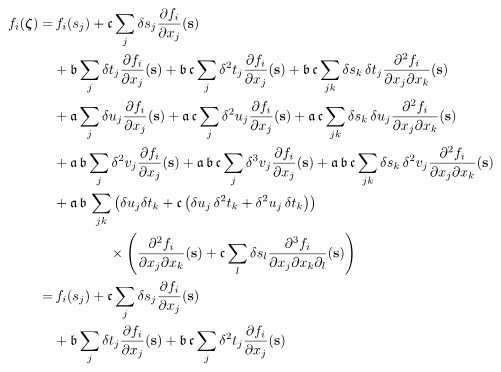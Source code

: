 \begin{align*}
f_{i} \! \left( \mbox{\boldmath{$\zeta$}} \right)
%
=& \,
f_{i} \! \left( s_{j} \right) + \mathfrak{c} \sum_{j} \delta s_{j} 
\frac{ \partial f_{i} }{ \partial x_{j} } \! \left( \mathbf{s} \right)
\\
&+ 
\mathfrak{b} \sum_{j} \delta t_{j} \frac{ \partial f_{i} }{ \partial x_{j} } \! \left( \mathbf{s} \right)
+ \mathfrak{b} \, \mathfrak{c} \sum_{j} \delta^{2} t_{j} 
\frac{ \partial f_{i} }{ \partial x_{j} } \! \left( \mathbf{s} \right) 
+ \mathfrak{b} \, \mathfrak{c} \sum_{jk} \delta s_{k} \, \delta t_{j} 
\frac{ \partial^{2} f_{i} }{ \partial x_{j} \partial x_{k} } \! \left( \mathbf{s} \right)
\\
&+ 
\mathfrak{a} \sum_{j} \delta u_{j} \frac{ \partial f_{i} }{ \partial x_{j} } \! \left( \mathbf{s} \right)
+ \mathfrak{a} \, \mathfrak{c} \sum_{j} \delta^{2} u_{j} 
\frac{ \partial f_{i} }{ \partial x_{j} } \! \left( \mathbf{s} \right) 
+ \mathfrak{a} \, \mathfrak{c} \sum_{jk} \delta s_{k} \, \delta u_{j} 
\frac{ \partial^{2} f_{i} }{ \partial x_{j} \partial x_{k} } \! \left( \mathbf{s} \right)
\\
&+ 
\mathfrak{a} \, \mathfrak{b} \sum_{j} \delta^{2} v_{j} 
\frac{ \partial f_{i} }{ \partial x_{j} } \! \left( \mathbf{s} \right)
+ \mathfrak{a} \, \mathfrak{b} \, \mathfrak{c} \sum_{j} \delta^{3} v_{j} 
\frac{ \partial f_{i} }{ \partial x_{j} } \! \left( \mathbf{s} \right) 
+ \mathfrak{a} \, \mathfrak{b} \, \mathfrak{c} \sum_{jk} \delta s_{k} \, \delta^{2} v_{j} 
\frac{ \partial^{2} f_{i} }{ \partial x_{j} \partial x_{k} } \! \left( \mathbf{s} \right)
\\
&+ 
\mathfrak{a} \, \mathfrak{b} \, \sum_{jk} 
\left( \delta u_{j} \delta t_{k}
+ \mathfrak{c} \left(
\delta u_{j} \, \delta^{2} t_{k} + \delta^{2} u_{j} \, \delta t_{k} 
\right) \right)
\\
& \quad\quad\quad\quad \times \left(
\frac{ \partial^{2} f_{i} }{ \partial x_{j} \partial x_{k} } \! \left( \mathbf{s} \right) 
+ \mathfrak{c} \sum_{l} \delta s_{l} 
\frac{ \partial^{3} f_{i} }{ \partial x_{j} \partial x_{k} \partial_{l} } \! \left( \mathbf{s} \right)
\right)
\\
%
=& \,
f_{i} \! \left( s_{j} \right) + \mathfrak{c} \sum_{j} \delta s_{j} 
\frac{ \partial f_{i} }{ \partial x_{j} } \! \left( \mathbf{s} \right)
\\
&+ 
\mathfrak{b} \sum_{j} \delta t_{j} \frac{ \partial f_{i} }{ \partial x_{j} } \! \left( \mathbf{s} \right)
+ \mathfrak{b} \, \mathfrak{c} \sum_{j} \delta^{2} t_{j} 
\frac{ \partial f_{i} }{ \partial x_{j} } \! \left( \mathbf{s} \right) 

\end{align*}

